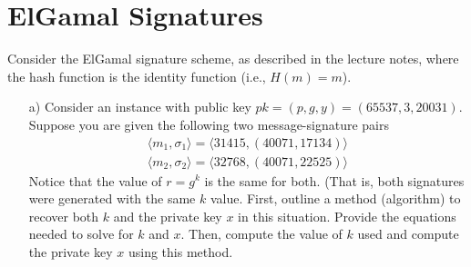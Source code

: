 \documentclass[12pt, letterpaper]{article}
\begin{document}
\newpage

\section{ElGamal Signatures}

Consider the ElGamal signature scheme, as described in the 
lecture notes, where the hash function is the identity 
function (i.e., $H(m) = m$).

\begin{itemize}
\item[a)] Consider an instance with public key 
$pk = (p,g,y) = (65537, 3, {20031})$.
Suppose you are given the following two message-signature
pairs 
\begin{align*}
\langle m_1, \sigma_1 \rangle = \langle 31415, (40071, 17134)\rangle \\
\langle m_2, \sigma_2 \rangle = \langle 32768, (40071, 22525)\rangle
\end{align*}
Notice that the value of $r=g^k$ is the same for both.  (That is, both signatures were 
generated with the same $k$ value. First, outline a method (algorithm) to 
recover both $k$ and the private key $x$ in this situation. 
Provide the equations needed to solve for $k$ and $x$.  Then, 
compute the value of $k$ used and compute the private key $x$
using this method.  


\end{itemize}
\end{document}
